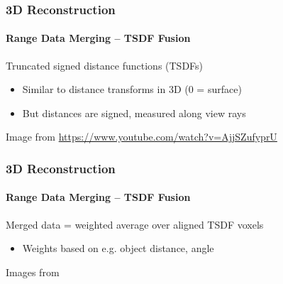 \documentclass[xetex,professionalfont]{beamer}
\newcommand{\eg}{\mbox{e.g.}\xspace} %
\begin{document}
\begin{frame}
\frametitle{3D Reconstruction}
\framesubtitle{Range Data Merging -- TSDF Fusion}

Truncated signed distance functions (TSDFs)
\begin{itemize}
	\item Similar to distance transforms in 3D (0 = surface)
	\item But distances are signed, measured along view rays 
\end{itemize}

\begin{center}
    {\centering Image from \url{https://www.youtube.com/watch?v=AjjSZufyprU}}
\end{center}

\end{frame}


\begin{frame}
\frametitle{3D Reconstruction}
\framesubtitle{Range Data Merging -- TSDF Fusion}

Merged data = weighted average over aligned TSDF voxels
\begin{itemize}
	\item Weights based on \eg object distance, angle
\end{itemize}

\begin{center}
    {\centering Images from \cite{curless1996}}
\end{center}

\end{frame}
\end{document}
